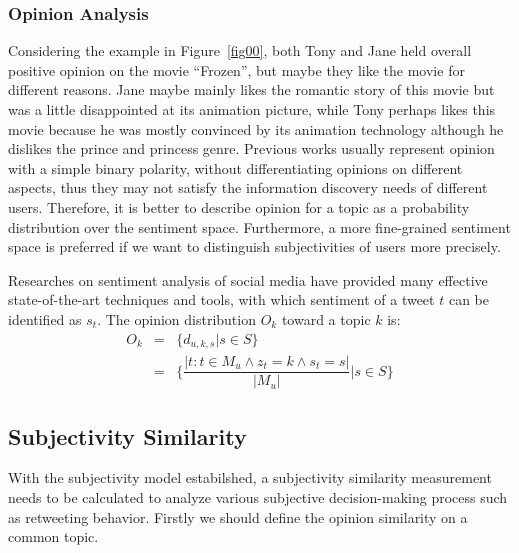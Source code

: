 \documentclass[letterpaper]{article}
\begin{document}
\subsubsection{Opinion Analysis}
\label{opinion}

Considering the example in Figure~\ref{fig00}, both Tony and Jane held overall positive opinion on the movie ``Frozen'', but maybe they like the movie for different reasons. Jane maybe mainly likes the romantic story of this movie but was a little disappointed at its animation picture, while Tony perhaps likes this movie because he was mostly convinced by its animation technology although he dislikes the prince and princess genre. Previous works usually represent opinion with a simple binary polarity, without differentiating opinions on different aspects, thus they may not satisfy the information discovery needs of different users. Therefore, it is better to describe opinion for a topic as a probability distribution over the sentiment space. Furthermore, a more fine-grained sentiment space is preferred if we want to distinguish subjectivities of users more precisely.

Researches on sentiment analysis of social media have provided many effective state-of-the-art techniques and tools\cite{thelwall2010sentiment,hu2013unsupervised}, with which sentiment of a tweet $ t $ can be identified as $ s_t $. The opinion distribution $ O_k $ toward a topic $ k $ is:
\begin{eqnarray}
O_k &= & \{ d_{u,k,s}|s \in S \} \nonumber \\
  &=& \{ \dfrac{|t:t \in M_u \wedge z_t=k \wedge s_t=s|}{|M_u|}|s \in S\}
\end{eqnarray}

\subsection{Subjectivity Similarity}
\label{similarity}

With the subjectivity model estabilshed, a subjectivity similarity measurement needs to be calculated to analyze various subjective decision-making process such as retweeting behavior. 
Firstly we should define the opinion similarity on a common topic. 
 
\end{document}
